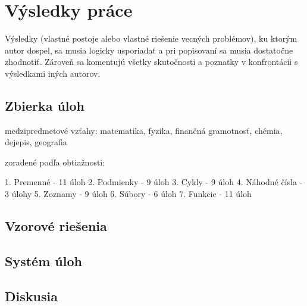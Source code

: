 \chapter{Výsledky práce}


Výsledky (vlastné postoje alebo vlastné riešenie vecných problémov), ku ktorým autor dospel, sa musia logicky usporiadať a pri popisovaní sa musia dostatočne zhodnotiť. Zároveň sa komentujú všetky skutočnosti a poznatky v konfrontácii s výsledkami iných autorov. 

\section{Zbierka úloh}
medzipredmetové vzťahy: matematika, fyzika, finančná gramotnosť, chémia, dejepis, geografia

zoradené podľa obtiažnosti: 

1. Premenné - 11 úloh
2. Podmienky - 9 úloh
3. Cykly - 9 úloh
4. Náhodné čísla - 3 úlohy
5. Zoznamy - 9 úloh
6. Súbory - 6 úloh
7. Funkcie - 11 úloh





%
%
%


\section{Vzorové riešenia}





%
%
%

\section{Systém úloh}





\section{Diskusia} 

 
